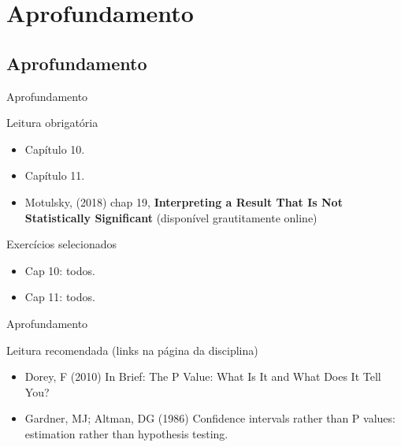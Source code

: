 \documentclass{beamer}
\begin{document}

\section{Aprofundamento}

\subsection{Aprofundamento}

\begin{frame}{Aprofundamento}
  \begin{block}{Leitura obrigatória}
    \footnotesize
    \begin{itemize}
    \item Capítulo 10.
    \item Capítulo 11.
    \item Motulsky, (2018) chap 19, {\bf Interpreting a Result That Is Not Statistically Significant} ({\scriptsize disponível grautitamente online})
    \end{itemize}
  \end{block}
  \begin{block}{Exercícios selecionados}
    \footnotesize
    \begin{itemize}
    \item Cap 10: todos.
    \item Cap 11: todos.
    \end{itemize}
  \end{block}
\end{frame}

\begin{frame}{Aprofundamento}
  \begin{block}{Leitura recomendada (links na página da disciplina)}
    \scriptsize
    \begin{itemize}
    \item Dorey, F (2010) In Brief: The P Value: What Is It and What Does It Tell You?
    \item Gardner, MJ; Altman, DG (1986) Confidence intervals rather than P values: estimation rather than hypothesis testing.
    \end{itemize}
  \end{block}
\end{frame}
\end{document}
